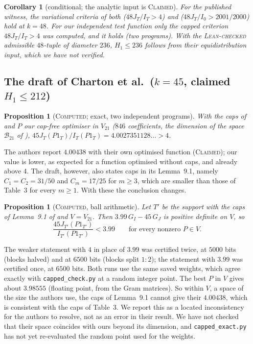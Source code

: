 \documentclass[11pt]{amsart}
\newtheorem{proposition}[theorem]{Proposition}
\newtheorem{corollary}[theorem]{Corollary}
\theoremstyle{definition}
\theoremstyle{remark}
\newcommand{\lbl}[1]{\textup{\textsc{#1}}}
\begin{document}
\begin{corollary}[conditional; the analytic input is \lbl{Claimed}]
For the published witness, the variational criteria of both \cite{Kin26}
($48J_T/I_T>4$) and \cite{SY26} ($48J_T/I_0>2001/2000$) hold at $k=48$. For
our independent test function only the capped criterion $48J_T/I_T>4$ was
computed, and it holds (two programs). With the
\lbl{Lean-checked} admissible $48$-tuple of diameter $236$, $H_1\le236$
follows from their equidistribution input, which we have not verified.
\end{corollary}

\subsection*{The draft of Charton et al.\ ($k=45$, claimed $H_1\le212$)}

\begin{proposition}[\lbl{Computed}; exact, two independent programs]\label{prop:212}
With the caps of \cite[Table~3]{Cha26} and $P$ our cap-free optimiser in
$V_{21}$ ($846$ coefficients, the dimension of the space
$\mathcal B_{21}$ of \cite[Thm.~11.1]{Cha26}),
$45J_T(P1_T)/I_T(P1_T)=4.0027351128\ldots>4$.
\end{proposition}

The authors report $4.00438$ with their own optimised function (\lbl{Claimed});
our value is lower, as expected for a function optimised without caps, and
already above $4$. The draft, however, also states caps in its Lemma~9.1,
namely $C_1=C_2=31/50$ and $C_m=17/25$ for $m\ge3$, which are smaller than
those of Table~3 for every $m\ge1$. With these the conclusion changes.

\begin{proposition}[\lbl{Computed}, ball arithmetic]\label{prop:ceiling}
Let $T'$ be the support with the caps of Lemma~9.1 of \cite{Cha26} and
$V=V_{21}$. Then $3.99\,G_I-45\,G_J$ is positive definite on
$V$, so
\[
\frac{45J_{T'}(P1_{T'})}{I_{T'}(P1_{T'})}<3.99\qquad\text{for every nonzero }P\in V.
\]
\end{proposition}

The weaker statement with $4$ in place of $3.99$ was certified twice, at
$5000$ bits (blocks halved) and at $6500$ bits (blocks split $1:2$); the
statement with $3.99$ was certified once, at $6500$ bits. Both runs use the
same saved weights, which agree exactly with \texttt{capped\_check.py} at a
random integer point. The best $P$ in $V$ gives
about $3.98555$ (floating point, from the Gram matrices). So within $V$, a
space of the size the authors use, the caps of Lemma~9.1 cannot give their
$4.00438$, which is consistent with the caps of Table~3. We report this as a
located inconsistency for the authors to resolve, not as an error in their
result. We have not checked that their space coincides with ours beyond its
dimension, and \texttt{capped\_exact.py} has not yet re-evaluated the random
point used for the weights.
\end{document}
